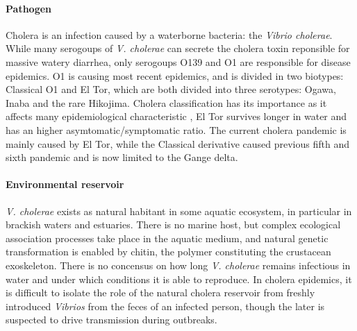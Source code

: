 \paragraph{Pathogen} Cholera is an infection caused by a waterborne bacteria: the \emph{Vibrio cholerae}. While many serogoups of \emph{V. cholerae} can secrete the cholera toxin reponsible for massive watery diarrhea, only serogoups O139 and O1 are responsible for disease epidemics. O1 is causing most recent epidemics, and is divided in two biotypes: Classical O1 and El Tor, which are both divided into three serotypes: Ogawa, Inaba and the rare Hikojima\cite{Kaper:Cholera:1995}. Cholera classification has its importance as it affects many epidemiological characteristic \eg, El Tor survives longer in water and has an higher asymtomatic/symptomatic ratio\cite{WHO:CholeraVaccinesWHO:2017}. The current cholera pandemic is mainly caused by El Tor, while the Classical derivative caused previous fifth and sixth pandemic and is now limited to the Gange delta\cite{Nair:CholeraDueAltered:2006}. 

 \paragraph{Environmental reservoir}  \textit{V. cholerae} exists as natural habitant in some aquatic ecosystem, in particular in brackish waters and estuaries. There is no marine host, but complex ecological association processes take place in the aquatic medium, and natural genetic transformation is enabled by chitin, the polymer constituting the crustacean exoskeleton\cite{Reidl:VibrioCholeraeCholera:2002,Meibom:ChitinInducesNatural:2005}. There is no concensus on how long \textit{V. cholerae} remains infectious in water and under which conditions it is able to reproduce\cite{Mavian:ToxigenicVibrioCholerae:2020}. In cholera epidemics, it is difficult to isolate the role of the natural cholera reservoir from freshly introduced \textit{Vibrios} from the feces of an infected person, though the later is suspected to drive  transmission during outbreaks.

